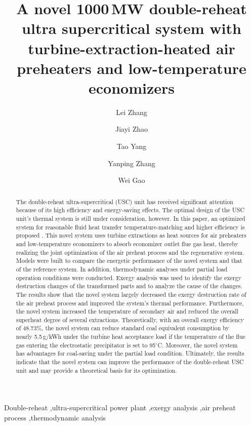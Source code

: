 \documentclass[preprint,12pt]{elsarticle}
\begin{document}
\begin{frontmatter}



\title{A novel 1000\,MW double-reheat ultra supercritical system with turbine-extraction-heated air preheaters and low-temperature economizers}


\author[hust,ncst]{Lei Zhang}
\author[hust]{Jiayi Zhao}
\author[hust]{Tao Yang}
\author[hust]{Yanping Zhang}
\author[hust]{Wei Gao}


\address[hust]{School of Energy and Power Engineering, Huazhong University of Science and Technology, Wuhan 430074, China}
\address[ncst]{College of Metallurgy and Energy, North China University of Science and Technology, Tangshan 063009, China}

\begin{abstract}
The double-reheat ultra-supercritical (USC) unit has received significant attention because of its high efficiency and energy-saving effects.
The optimal design of the USC unit's thermal system is still under consideration, however.
In this paper, an optimized system for reasonable fluid heat transfer temperature-matching and higher efficiency is proposed .
This novel system uses turbine extractions as heat sources for air preheaters and low-temperature economizers to absorb economizer outlet flue gas heat, thereby realizing the joint optimization of the air preheat process and the regenerative system.
Models were built to compare the energetic performance of the novel system and that of the reference system.
In addition, thermodynamic analyses under partial load operation conditions were conducted. 
Exergy analysis was used to identify the exergy destruction changes of the transformed parts and to analyze the cause of the changes.
The results show that the novel system largely decreased the exergy destruction rate of the air preheat process and improved the system's thermal performance.
Furthermore, the novel system increased the temperature of secondary air and reduced the overall superheat degree of several extractions.
Theoretically, with an overall exergy efficiency of 48.73\%, the novel system can reduce standard coal equivalent consumption by nearly 5.5\,g/kWh under the turbine heat acceptance load if the temperature of the flue gas entering the electrostatic precipitator is set to 95$^\circ$C.
Moreover, the novel system has advantages for coal-saving under the partial load condition.
Ultimately, the results indicate that the novel system can improve the performance of the double-reheat USC unit and may provide a theoretical basis for its optimization.

\end{abstract}

\begin{keyword}
Double-reheat \sep ultra-supercritical power plant \sep exergy analysis \sep air preheat process \sep thermodynamic analysis
\end{keyword}

\end{frontmatter}
\end{document}
